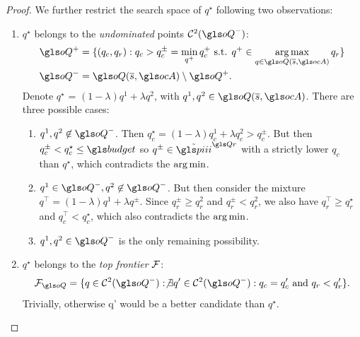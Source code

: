 \begin{subappendices}
\begin{proof}
    We further restrict the search space of $q^{\star}$ following two observations:
    \begin{enumerate}
        \item $q^{\star}$ belongs to the \emph{undominated} points $\cC^2(\oQ^-)$:
        \begin{align}
            \label{eq:q_minus_undominated}
            \oQ^+ &= \{(q_c, q_r): q_c > q_c^{\pm} = \min_{q^+} q_c^+\text{ s.t. }q^+\in\argmax_{q\in \oQ(\os,\ocA)} q_r\}\\
            \oQ^- &= \oQ(\os,\ocA) \setminus \oQ^+.
        \end{align}
        Denote $q^{\star}$ = $(1-\lambda) q^1 + \lambda q^2$, with $q^1, q^2\in \oQ(\os,\ocA)$. There are three possible cases:
        \begin{enumerate}
            \item $q^1, q^2 \not\in \oQ^-$. Then $q_c^{\star} = (1-\lambda) q^1_c + \lambda q^2_c > q_c^{\pm}$. But then $q_c^{\pm} < q_c^{\star} \leq \budget$ so $q^{\pm}\in\tilde{\policies}^{\Qr}$ with a strictly lower $q_c$ than $q^{\star}$, which contradicts the $\operatorname*{arg\,min}$.
            \item $q^1\in \oQ^-, q^2 \not\in \oQ^-$. But then consider the mixture $q^\top = (1-\lambda) q^1 + \lambda q^\pm$. Since $q_r^{\pm} \geq q_r^{2}$ and $q_r^{\pm} < q_r^{2}$, we also have $q^\top_r \geq q_r^{\star}$ and $q^\top_c < q_c^{\star}$, which also contradicts the $\operatorname*{arg\,min}$.
            \item $q^1,q^2\in \oQ^-$ is the only remaining possibility.
        \end{enumerate}
        \item $q^{\star}$ belongs to the \emph{top frontier} $\mathcal{F}$:
        \begin{equation}
            \label{eq:top-frontier}
            \cF_{\oQ} = \{q\in \cC^2(\oQ^-): \not\exists q'\in \cC^2(\oQ^-): q_c=q_c'\text{ and }q_r<q_r'\}.
        \end{equation}
        Trivially, otherwise q' would be a better candidate than $q^{\star}$.
    \end{enumerate}



\end{proof}
\end{subappendices}
